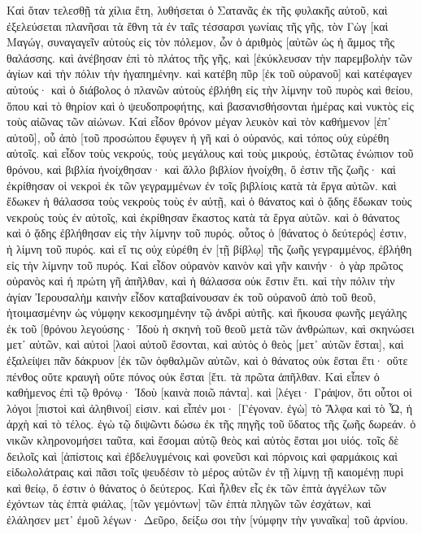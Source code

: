 Καὶ ὅταν τελεσθῇ τὰ χίλια ἔτη, λυθήσεται ὁ Σατανᾶς ἐκ τῆς φυλακῆς αὐτοῦ, 
καὶ ἐξελεύσεται πλανῆσαι τὰ ἔθνη τὰ ἐν ταῖς τέσσαρσι γωνίαις τῆς γῆς, τὸν Γὼγ [καὶ Μαγώγ, συναγαγεῖν αὐτοὺς εἰς τὸν πόλεμον, ὧν ὁ ἀριθμὸς [αὐτῶν ὡς ἡ ἄμμος τῆς θαλάσσης. 
καὶ ἀνέβησαν ἐπὶ τὸ πλάτος τῆς γῆς, καὶ [ἐκύκλευσαν τὴν παρεμβολὴν τῶν ἁγίων καὶ τὴν πόλιν τὴν ἠγαπημένην. καὶ κατέβη πῦρ [ἐκ τοῦ οὐρανοῦ] καὶ κατέφαγεν αὐτούς· 
καὶ ὁ διάβολος ὁ πλανῶν αὐτοὺς ἐβλήθη εἰς τὴν λίμνην τοῦ πυρὸς καὶ θείου, ὅπου καὶ τὸ θηρίον καὶ ὁ ψευδοπροφήτης, καὶ βασανισθήσονται ἡμέρας καὶ νυκτὸς εἰς τοὺς αἰῶνας τῶν αἰώνων. 
Καὶ εἶδον θρόνον μέγαν λευκὸν καὶ τὸν καθήμενον [ἐπ᾽ αὐτοῦ], οὗ ἀπὸ [τοῦ προσώπου ἔφυγεν ἡ γῆ καὶ ὁ οὐρανός, καὶ τόπος οὐχ εὑρέθη αὐτοῖς. 
καὶ εἶδον τοὺς νεκρούς, τοὺς μεγάλους καὶ τοὺς μικρούς, ἑστῶτας ἐνώπιον τοῦ θρόνου, καὶ βιβλία ἠνοίχθησαν· καὶ ἄλλο βιβλίον ἠνοίχθη, ὅ ἐστιν τῆς ζωῆς· καὶ ἐκρίθησαν οἱ νεκροὶ ἐκ τῶν γεγραμμένων ἐν τοῖς βιβλίοις κατὰ τὰ ἔργα αὐτῶν. 
καὶ ἔδωκεν ἡ θάλασσα τοὺς νεκροὺς τοὺς ἐν αὐτῇ, καὶ ὁ θάνατος καὶ ὁ ᾅδης ἔδωκαν τοὺς νεκροὺς τοὺς ἐν αὐτοῖς, καὶ ἐκρίθησαν ἕκαστος κατὰ τὰ ἔργα αὐτῶν. 
καὶ ὁ θάνατος καὶ ὁ ᾅδης ἐβλήθησαν εἰς τὴν λίμνην τοῦ πυρός. οὗτος ὁ [θάνατος ὁ δεύτερός] ἐστιν, ἡ λίμνη τοῦ πυρός. 
καὶ εἴ τις οὐχ εὑρέθη ἐν [τῇ βίβλῳ] τῆς ζωῆς γεγραμμένος, ἐβλήθη εἰς τὴν λίμνην τοῦ πυρός. 
Καὶ εἶδον οὐρανὸν καινὸν καὶ γῆν καινήν· ὁ γὰρ πρῶτος οὐρανὸς καὶ ἡ πρώτη γῆ ἀπῆλθαν, καὶ ἡ θάλασσα οὐκ ἔστιν ἔτι. 
καὶ τὴν πόλιν τὴν ἁγίαν Ἰερουσαλὴμ καινὴν εἶδον καταβαίνουσαν ἐκ τοῦ οὐρανοῦ ἀπὸ τοῦ θεοῦ, ἡτοιμασμένην ὡς νύμφην κεκοσμημένην τῷ ἀνδρὶ αὐτῆς. 
καὶ ἤκουσα φωνῆς μεγάλης ἐκ τοῦ [θρόνου λεγούσης· Ἰδοὺ ἡ σκηνὴ τοῦ θεοῦ μετὰ τῶν ἀνθρώπων, καὶ σκηνώσει μετ᾽ αὐτῶν, καὶ αὐτοὶ [λαοὶ αὐτοῦ ἔσονται, καὶ αὐτὸς ὁ θεὸς [μετ᾽ αὐτῶν ἔσται], 
καὶ ἐξαλείψει πᾶν δάκρυον [ἐκ τῶν ὀφθαλμῶν αὐτῶν, καὶ ὁ θάνατος οὐκ ἔσται ἔτι· οὔτε πένθος οὔτε κραυγὴ οὔτε πόνος οὐκ ἔσται [ἔτι. τὰ πρῶτα ἀπῆλθαν. 
Καὶ εἶπεν ὁ καθήμενος ἐπὶ τῷ θρόνῳ· Ἰδοὺ [καινὰ ποιῶ πάντα]. καὶ [λέγει· Γράψον, ὅτι οὗτοι οἱ λόγοι [πιστοὶ καὶ ἀληθινοί] εἰσιν. 
καὶ εἶπέν μοι· [Γέγοναν. ἐγὼ] τὸ Ἄλφα καὶ τὸ Ὦ, ἡ ἀρχὴ καὶ τὸ τέλος. ἐγὼ τῷ διψῶντι δώσω ἐκ τῆς πηγῆς τοῦ ὕδατος τῆς ζωῆς δωρεάν. 
ὁ νικῶν κληρονομήσει ταῦτα, καὶ ἔσομαι αὐτῷ θεὸς καὶ αὐτὸς ἔσται μοι υἱός. 
τοῖς δὲ δειλοῖς καὶ [ἀπίστοις καὶ ἐβδελυγμένοις καὶ φονεῦσι καὶ πόρνοις καὶ φαρμάκοις καὶ εἰδωλολάτραις καὶ πᾶσι τοῖς ψευδέσιν τὸ μέρος αὐτῶν ἐν τῇ λίμνῃ τῇ καιομένῃ πυρὶ καὶ θείῳ, ὅ ἐστιν ὁ θάνατος ὁ δεύτερος. 
Καὶ ἦλθεν εἷς ἐκ τῶν ἑπτὰ ἀγγέλων τῶν ἐχόντων τὰς ἑπτὰ φιάλας, [τῶν γεμόντων] τῶν ἑπτὰ πληγῶν τῶν ἐσχάτων, καὶ ἐλάλησεν μετ᾽ ἐμοῦ λέγων· Δεῦρο, δείξω σοι τὴν [νύμφην τὴν γυναῖκα] τοῦ ἀρνίου. 

